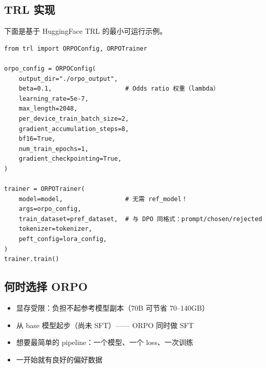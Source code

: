 \subsection{TRL 实现}
\label{trl-implementation-3}

下面是基于 HuggingFace TRL 的最小可运行示例。

\begin{lstlisting}[style=pythonstyle]
from trl import ORPOConfig, ORPOTrainer

orpo_config = ORPOConfig(
    output_dir="./orpo_output",
    beta=0.1,                    # Odds ratio 权重（lambda）
    learning_rate=5e-7,
    max_length=2048,
    per_device_train_batch_size=2,
    gradient_accumulation_steps=8,
    bf16=True,
    num_train_epochs=1,
    gradient_checkpointing=True,
)

trainer = ORPOTrainer(
    model=model,                 # 无需 ref_model！
    args=orpo_config,
    train_dataset=pref_dataset,  # 与 DPO 同格式：prompt/chosen/rejected
    tokenizer=tokenizer,
    peft_config=lora_config,
)
trainer.train()
\end{lstlisting}

\subsection{何时选择 ORPO}
\label{when-to-choose-orpo}

\begin{itemize}
  \item 显存受限：负担不起参考模型副本（70B 可节省 70--140GB）
  \item 从 base 模型起步（尚未 SFT）—— ORPO 同时做 SFT
  \item 想要最简单的 pipeline：一个模型、一个 loss、一次训练
  \item 一开始就有良好的偏好数据
\end{itemize}

